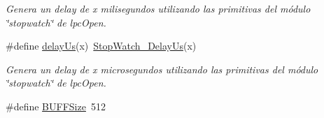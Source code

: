 \begin{DoxyCompactItemize}
\begin{DoxyCompactList}\small\item\em Genera un delay de x milisegundos utilizando las primitivas del módulo \char`\"{}stopwatch\char`\"{} de lpc\+Open. \end{DoxyCompactList}\item 
\#define \hyperlink{group__hardware_ga1d13abaa815195d73e9dc2676e6fba5b}{delay\+Us}(x)~\hyperlink{group___stop___watch_ga3bc7706d1a9cb32888f82b2874c3655c}{Stop\+Watch\+\_\+\+Delay\+Us}(x)
\begin{DoxyCompactList}\small\item\em Genera un delay de x microsegundos utilizando las primitivas del módulo \char`\"{}stopwatch\char`\"{} de lpc\+Open. \end{DoxyCompactList}\item 
\#define \hyperlink{group__hardware_ga571c3b0aaee2fe73b34cb9a7e26de731}{B\+U\+F\+F\+Size}~512
\end{DoxyCompactItemize}
